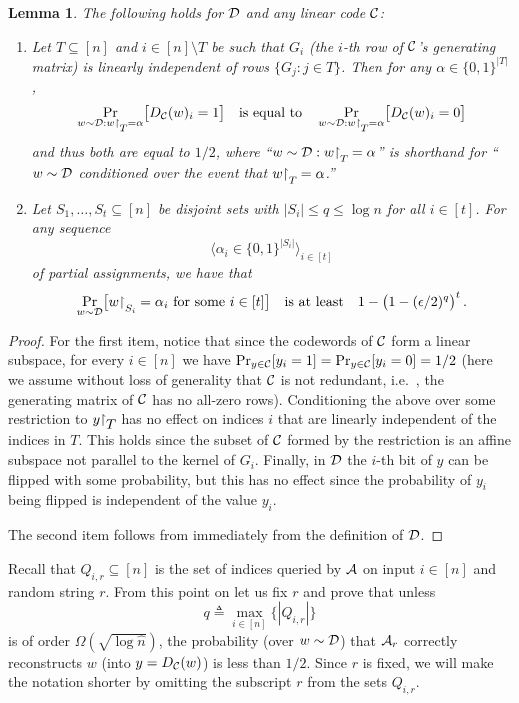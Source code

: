 \documentclass[10pt]{article}
\newtheorem{lemma}[theorem]{Lemma}
\theoremstyle{definition}
\providecommand{\ie}{i.e.\ }
\numberwithin{equation}{section}
\newcommand{\ALG}{{\cal A}}
\newcommand{\DD}{{\cal D}}
\newcommand{\CC}{{\cal C}}
\newcommand{\zo}{{\{0,1\}}}
\newcommand{\DEC}{{D_{\cal C}}}
\newcommand{\nrows}{{\hat n }}
\newcommand{\rst}[1]{\ensuremath{{\mathbin\upharpoonright}%
\raise-.9ex\hbox{$#1$}}}
\newcommand{\rstsmall}[1]{\ensuremath{{\mathbin\upharpoonright}%
\raise-.9ex\hbox{\scriptsize $#1$}}}
\begin{document}
\begin{lemma}\label{lem:cdwD} The following holds for $\DD$  and any linear code $\CC$:
\begin{enumerate}
\item Let $T \subseteq [n]$ and $i \in [n] \setminus T$ be such that $G_i$ 
(the
%
$i$-th 
row of $\CC$'s generating matrix) is linearly independent of rows
$\{G_j: j \in T\}$. Then for any $\alpha \in \zo^{|T|}$,
\[
\Pr_{w \sim \DD : w\rstsmall{T}=\alpha} \bigl[\DEC(w)_i = 1\bigr]\quad\text{is equal
  to}\quad \Pr_{w \sim \DD : w\rstsmall{T}=\alpha} \bigl[\DEC(w)_i = 0\bigr]
\]
and thus both are equal to ${1}/{2}$,
where ``$w \sim \DD : w\rstsmall{T}=\alpha$'' is shorthand for ``$w \sim \DD$ conditioned over the event that $w\rstsmall{T}=\alpha$.''
\item Let $S_1,\ldots,S_t \subseteq [n]$ be disjoint sets with $|S_i|
  \leq q \leq \log n$ for all $i \in [t]$. For any sequence 
\[
\langle
  \alpha_i \in \zo^{|S_i|} \rangle_{i \in [t]}\] of partial
  assignments, we have that
  \[
  \Pr_{w \sim \DD}\bigl[w\rstsmall{S_i} = \alpha_i \mathrm{\ for\ some\ }i
  \in [t]\bigr]\quad\text{is at least}\quad 1-\bigl(1-(\epsilon/2)^q\bigr)^t\,.
\]
\end{enumerate}
\end{lemma}

\begin{proof}
For the first item, notice that since the codewords of $\CC$ form a linear subspace, for every $i \in [n]$ we have $\Pr_{y \in \CC}[y_i = 1] = \Pr_{y \in \CC}[y_i = 0] = 1/2$ (here we assume without loss of generality that $\CC$ is not redundant, \ie, the generating matrix of $\CC$ has no all-zero rows).
Conditioning the above over some restriction to $y\rst{T}$ has no effect on indices $i$ that are linearly independent of the indices in $T$. This holds since the subset of $\CC$ formed by the restriction is an affine subspace not parallel to the kernel of $G_i$.
Finally, in $\DD$ the 
%
$i$-th 
bit of $y$ can be flipped with some probability, but this has no effect since the probability of $y_i$ being flipped is independent of the value $y_i$.

The second item follows from immediately from the definition of $\DD$.
\end{proof}


Recall that $Q_{i,r}\subseteq [n]$ is the set of indices queried by
$\ALG$ on input $i\in [n]$ and random string $r$. {}From this point on
let us fix $r$ and prove that unless
\[
q \triangleq \max_{i \in [n]}\bigl\{|Q_{i,r}|\bigr\}
\]
is of order $\Omega(\sqrt{\log \nrows})$, the probability (over $w \sim \DD$) that $\ALG_r$ correctly reconstructs $w$ (into $y=\DEC(w)$) is less than $1/2$.  Since $r$ is fixed, we will make the notation shorter by omitting the subscript $r$ from the sets $Q_{i,r}$.
\end{document}
